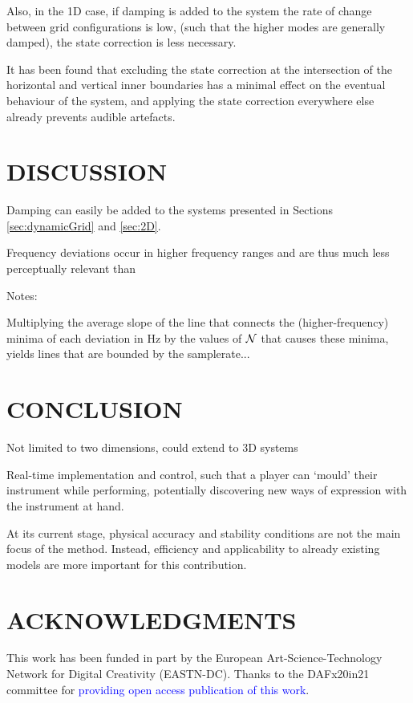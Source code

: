 \documentclass[fleqn]{jaes}
\def\SWcomment[#1]{\textcolor{blue}{#1}}
\begin{document}
Also, in the 1D case, if damping is added to the system the rate of change between grid configurations is low, (such that the higher modes are generally damped), the state correction is less necessary.

It has been found that excluding the state correction at the intersection of the horizontal and vertical inner boundaries has a minimal effect on the eventual behaviour of the system, and applying the state correction everywhere else already prevents audible artefacts.
\section{DISCUSSION}\label{sec:discussion}
Damping can easily be added to the systems presented in Sections \ref{sec:dynamicGrid} and \ref{sec:2D}.

Frequency deviations occur in higher frequency ranges and are thus much less perceptually relevant than 

Notes:

Multiplying the average slope of the line that connects the (higher-frequency) minima of each deviation in Hz by the values of $\mathcal{N}$ that causes these minima, yields lines that are bounded by the samplerate...



\section{CONCLUSION}\label{sec:conclusion}
Not limited to two dimensions, could extend to 3D systems

Real-time implementation and control, such that a player can `mould' their instrument while performing, potentially discovering new ways of expression with the instrument at hand.   

At its current stage, physical accuracy and stability conditions are not the main focus of the method. Instead, efficiency and applicability to already existing models are more important for this contribution.


\section{ACKNOWLEDGMENTS}
This  work  has  been  funded  in  part  by  the European Art-Science-Technology Network for Digital Creativity (EASTN-DC). Thanks to the DAFx20in21 committee for \SWcomment[providing open access publication of this work].



\end{document}
